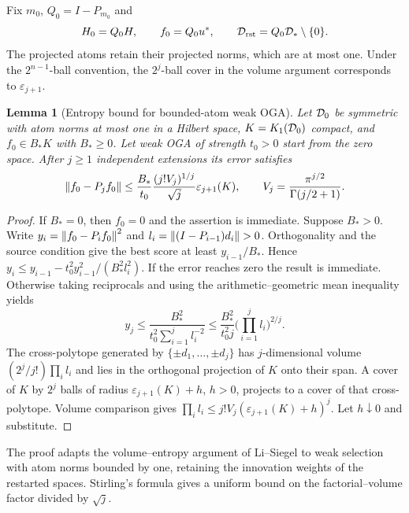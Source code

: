 \documentclass[11pt]{article}
\newtheorem{lemma}[theorem]{Lemma}
\theoremstyle{remark}
\begin{document}
Fix $m_0$, $Q_0=I-P_{m_0}$ and
\[
 H_0=Q_0H,\qquad f_0=Q_0u^*,\qquad
 \mathcal D_{\rm rst}=Q_0\mathcal D_*\setminus\{0\}.
\]
The projected atoms retain their projected norms, which are at most one. Under the \(2^{n-1}\)-ball convention, the \(2^j\)-ball cover in the volume argument corresponds to \(\varepsilon_{j+1}\).

\begin{lemma}[Entropy bound for bounded-atom weak OGA]
\label{lem:c5-entropy}
Let $\mathcal D_0$ be symmetric with atom norms at most one in a Hilbert space,
$K=K_1(\mathcal D_0)$ compact, and $f_0\in B_*K$ with $B_*\geq0$.
Let weak OGA of strength $t_0>0$ start from the zero space.
After $j\geq1$ independent extensions its error satisfies
\begin{equation}
 \left\lVert f_0-P_jf_0\right\rVert\leq
 \frac{B_*}{t_0}\frac{(j!V_j)^{1/j}}{\sqrt j}
                    \varepsilon_{j+1}(K),\qquad
 V_j=\frac{\pi^{j/2}}{\Gamma(j/2+1)} .
 \label{eq:c5-entropy}
\end{equation}
\end{lemma}
\begin{proof}
If $B_*=0$, then $f_0=0$ and the assertion is immediate. Suppose $B_*>0$.
Write $y_i=\left\lVert f_0-P_if_0\right\rVert^2$ and
$l_i=\left\lVert(I-P_{i-1})d_i\right\rVert>0$.
Orthogonality and the source condition give the best score at least
$y_{i-1}/B_*$. Hence
$y_i\leq y_{i-1}-t_0^2y_{i-1}^2/(B_*^2l_i^2)$.
If the error reaches zero the result is immediate. Otherwise taking
reciprocals and using the arithmetic--geometric mean inequality yields
\[
 y_j\leq \frac{B_*^2}{t_0^2\sum_{i=1}^jl_i^{-2}}
 \leq \frac{B_*^2}{t_0^2j}\Big(\prod_{i=1}^jl_i\Big)^{2/j}.
\]
The cross-polytope generated by $\{\pm d_1,\ldots,\pm d_j\}$ has
$j$-dimensional volume $(2^j/j!)\prod_i l_i$ and lies in the orthogonal
projection of $K$ onto their span. A cover of $K$ by $2^j$ balls of radius
\(\varepsilon_{j+1}(K)+h\), \(h>0\), projects to a cover of that
cross-polytope. Volume comparison gives
$\prod_i l_i\leq j!V_j(\varepsilon_{j+1}(K)+h)^j$.
Let $h\downarrow0$ and substitute.
\end{proof}

The proof adapts the volume--entropy argument of Li--Siegel \cite[Theorem~4.2 and equations~(4.4)--(4.9)]{LiSiegelEntropy2024} to weak selection with atom norms bounded by one, retaining the innovation weights of the restarted spaces. Stirling's formula gives a uniform bound on the factorial--volume factor divided by $\sqrt j$.
\end{document}
